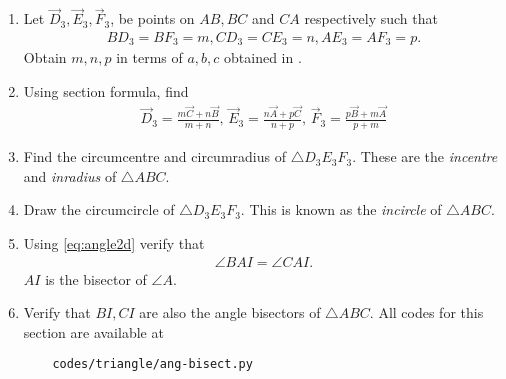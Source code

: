 \begin{enumerate}[label=\thesection.\arabic*.,ref=\thesection.\theenumi]
	\item Let $\vec{D}_3, \vec{E}_3, \vec{F}_3$, be points on $AB, BC$ and $CA$ respectively such that
		\begin{align}
			BD_3 = BF_3=m, CD_3 = CE_3=n, AE_3 = AF_3=p.
		\end{align}
	Obtain $m,n,p$ in terms of $a,b,c$ obtained in  
		.
 \\
 		
	\item Using section formula, find 
		\begin{align}
			\vec{D}_3 = \frac{m\vec{C}+n\vec{B}}{m+n},\,
			\vec{E}_3 = \frac{n\vec{A}+p\vec{C}}{n+p},\,
			\vec{F}_3 = \frac{p\vec{B}+m\vec{A}}{p+m}
		\end{align}
	\item Find the circumcentre and circumradius of $\triangle D_3E_3F_3$.  These are the {\em incentre} and {\em inradius} of $\triangle ABC$.
	\item Draw the circumcircle of $\triangle D_3E_3F_3$.  This is known as the {\em incircle} of $\triangle ABC$.
		\\
 		
	\item Using 
    \eqref{eq:angle2d}
verify that 
		\begin{align}
			\angle BAI = \angle CAI.
		\end{align}
		$AI$ is the bisector of $\angle A$.  
	\item Verify that $BI, CI$ are also the angle bisectors of $\triangle ABC$.
All codes for this section are available at
\begin{lstlisting}
	codes/triangle/ang-bisect.py
\end{lstlisting}

		\iffalse


\end{enumerate}
